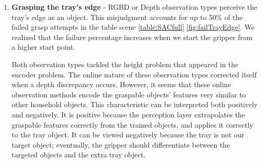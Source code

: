 \begin{enumerate}
    \item \textbf{Grasping the tray's edge} - RGBD or Depth observation types perceive the tray's edge as an object. This misjudgment accounts for up to 50\% of the failed grasp attempts in the table scene \ref{table:SACfull} \ref{fig:failTrayEdge}. We realized that the failure percentage increases when we start the gripper from a higher start point.

    Both observation types tackled the height problem that appeared in the encoder problem. The online nature of these observation types corrected itself when a depth discrepancy occurs. However, it seems that these online observation methods encode the graspable objects' features very similar to other household objects. This characteristic can be interpreted both positively and negatively. It is positive because the perception layer extrapolates the graspable features correctly from the trained objects, and applies it correctly to the tray object. It can be viewed negatively because the tray is not our target object; eventually, the gripper should differentiate between the targeted objects and the extra tray object.   
    

\end{enumerate}
